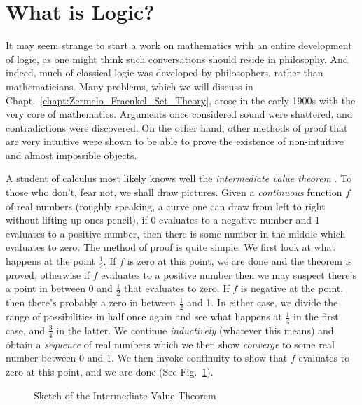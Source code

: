 \section{What is Logic?}
    It may seem strange to start a work on mathematics with an entire
    development of logic, as one might think such conversations should reside
    in philosophy. And indeed, much of classical logic was developed by
    philosophers, rather than mathematicians. Many problems, which we will
    discuss in Chapt.~\ref{chapt:Zermelo_Fraenkel_Set_Theory}, arose in the
    early 1900s with the very core of mathematics. Arguments once considered
    sound were shattered, and contradictions were discovered. On the other hand,
    other methods of proof that are very intuitive were shown to be able to
    prove the existence of non-intuitive and almost impossible objects.
    \begin{example}
        A student of calculus most likely knows well the
        \textit{intermediate value theorem}%
        . To those who don't, fear not, we
        shall draw pictures. Given a \textit{continuous} function $f$ of real
        numbers (roughly speaking, a curve one can draw from left to right
        without lifting up ones pencil), if $0$ evaluates to a negative number
        and $1$ evaluates to a positive number, then there is some number in the
        middle which evaluates to zero. The method of proof is quite simple:
        We first look at what happens at the point $\frac{1}{2}$. If $f$
        is zero at this point, we are done and the theorem is proved, otherwise
        if $f$ evaluates to a positive number then we may suspect there's a
        point in between 0 and $\frac{1}{2}$ that evaluates to zero. If $f$ is
        negative at the point, then there's probably a zero in between
        $\frac{1}{2}$ and 1. In either case, we divide the range of
        possibilities in half once again and see what happens at $\frac{1}{4}$
        in the first case, and $\frac{3}{4}$ in the latter. We continue
        \textit{inductively} (whatever this means) and obtain a
        \textit{sequence} of real numbers which we then show
        \textit{converge} to some real number between 0 and 1. We then invoke
        continuity to show that $f$ evaluates to zero at this point, and we are
        done (See Fig.~\ref{fig:Sketch_of_IVP}).
        \begin{figure}[H]
            \centering
            \captionsetup{type=figure}
            
            \caption{Sketch of the Intermediate Value Theorem}
            \label{fig:Sketch_of_IVP}
        \end{figure}
    \end{example}
